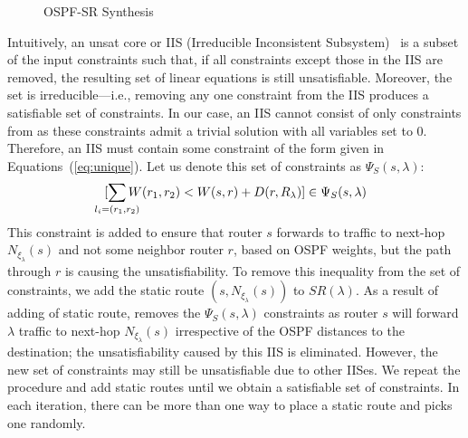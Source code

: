 \iffull
\begin{figure}
	\centering
	\vspace{-7mm}
	\begin{minipage}{0.7\columnwidth}
		\begin{algorithm}[H]
			\begin{footnotesize} 
				\caption{OSPF-SR Synthesis}
				\label{alg:unsat}
				\begin{algorithmic}[1]
					\EndWhile
					\EndProcedure
				\end{algorithmic}
			\end{footnotesize}
		\end{algorithm}
	\end{minipage}
\end{figure}
\fi

Intuitively, an unsat core or IIS (Irreducible Inconsistent Subsystem)~\cite{chinneck2007feasibility} 
is a subset of the input constraints such that,
if all constraints except those in the IIS are removed, the resulting set of
linear equations is still unsatisfiable. 
Moreover, the set is irreducible---i.e., removing 
any one constraint from the IIS produces a satisfiable set of constraints. 
In our case, an IIS cannot consist of only 
constraints from  as these constraints
admit a trivial solution with all variables set to 0. 
Therefore, an IIS must contain some constraint of the form
given in Equations~(\ref{eq:unique}). Let us denote 
this set of constraints as $\Psi_S(s, \lambda)$:
\[
[\sum_{\mathclap{\substack{l_i=(r_1,r_2)}}} 
W(r_1, r_2) < W(s, r) + D(r, R_\lambda) ] \in \Psi_S(s, \lambda)
\]	
This constraint is added to ensure 
that router $s$ forwards to traffic to next-hop
$N_{\xi_\lambda}(s)$ and not some neighbor router 
$r$, based on OSPF weights,
but the path through $r$ is causing the unsatisfiability. 
To remove this inequality from the set of constraints, 
we add the static route $(s,N_{\xi_\lambda}(s))$ to $SR(\lambda)$.
As a result of adding of static route, \name removes 
the $\Psi_S(s, \lambda)$ constraints as router $s$ 
will forward $\lambda$ traffic  to 
next-hop $N_{\xi_\lambda}(s)$ irrespective of
the OSPF distances to the destination; the 
unsatisfiability caused by this IIS is eliminated. 
However, the new set of
constraints may still be unsatisfiable due to other IISes.
We repeat the procedure and add static routes
until we obtain a satisfiable set of
constraints. 
In each iteration, there can be more than one way to place a static route and
\name picks one randomly. 

